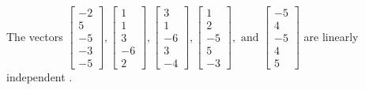 \begin{exercise}
\begin{exerciseStatement}
  \end{exerciseStatement}
  \begin{exerciseAnswer}
   The vectors \(\left[\begin{array}{r}
-2 \\
5 \\
-5 \\
-3 \\
-5
\end{array}\right] , \left[\begin{array}{r}
1 \\
1 \\
3 \\
-6 \\
2
\end{array}\right] , \left[\begin{array}{r}
3 \\
1 \\
-6 \\
3 \\
-4
\end{array}\right] , \left[\begin{array}{r}
1 \\
2 \\
-5 \\
5 \\
-3
\end{array}\right] , \text{ and } \left[\begin{array}{r}
-5 \\
4 \\
-5 \\
4 \\
5
\end{array}\right]\) are 
  	 linearly independent  .
  


  \end{exerciseAnswer}
\end{exercise}